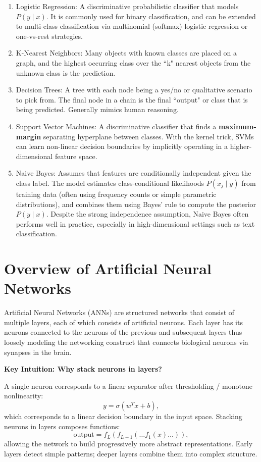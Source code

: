 \documentclass{article}
\begin{document}
\begin{enumerate}
    \item Logistic Regression: A discriminative probabilistic classifier that models \(P(y\mid x)\). It is commonly used for binary classification, and can be extended to multi-class classification via multinomial (softmax) logistic regression or one-vs-rest strategies.
    \item K-Nearest Neighbors: Many objects with known classes are placed on a graph, and the highest occurring class over the ``k" nearest objects from the unknown class is the prediction.
    \item Decision Trees: A tree with each node being a yes/no or qualitative scenario to pick from. The final node in a chain is the final ``output" or class that is being predicted. Generally mimics human reasoning.
    \item Support Vector Machines: A discriminative classifier that finds a \textbf{maximum-margin} separating hyperplane between classes. With the kernel trick, SVMs can learn non-linear decision boundaries by implicitly operating in a higher-dimensional feature space.
    \item Naive Bayes: Assumes that features are conditionally independent given the class label. The model estimates class-conditional likelihoods \(P(x_j \mid y)\) from training data (often using frequency counts or simple parametric distributions), and combines them using Bayes’ rule to compute the posterior \(P(y \mid x)\). Despite the strong independence assumption, Naive Bayes often performs well in practice, especially in high-dimensional settings such as text classification.
\end{enumerate}


\section{Overview of Artificial Neural Networks} %
Artificial Neural Networks (ANNs) are structured networks that consist of multiple layers, each of which consists of artificial neurons. Each layer has its neurons connected to the neurons of the previous and subsequent layers thus loosely modeling the networking construct that connects biological neurons via synapses in the brain.

\begin{mdframed}
\textbf{Key Intuition: Why stack neurons in layers?}

A single neuron corresponds to a linear separator after thresholding / monotone nonlinearity:
\[
y = \sigma(w^Tx + b),
\]
which corresponds to a linear decision boundary in the input space.
Stacking neurons in layers composes functions:
\[
\text{output} = f_L(f_{L-1}(\dots f_1(x)\dots)),
\]
allowing the network to build progressively more abstract representations.
Early layers detect simple patterns; deeper layers combine them into complex structure.
\end{mdframed}
\end{document}
